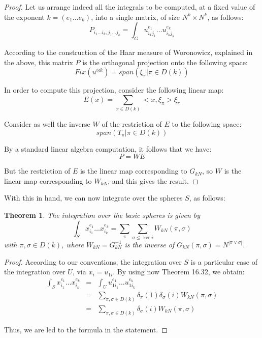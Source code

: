 \documentclass[12pt]{amsbook}
\newtheorem{theorem}{Theorem}[chapter]
\begin{document}
\begin{proof}
Let us arrange indeed all the integrals to be computed, at a fixed value of the exponent $k=(e_1\ldots e_k)$, into a single matrix, of size $N^k\times N^k$, as follows:
$$P_{i_1\ldots i_k,j_1\ldots j_k}=\int_Gu_{i_1j_1}^{e_1}\ldots u_{i_kj_k}^{e_k}$$

According to the construction of the Haar measure of Woronowicz, explained in the above, this matrix $P$ is the orthogonal projection onto the following space:
$$Fix(u^{\otimes k})=span\left(\xi_\pi\Big|\pi\in D(k)\right)$$ 

In order to compute this projection, consider the following linear map:
$$E(x)=\sum_{\pi\in D(k)}<x,\xi_\pi>\xi_\pi$$

Consider as well the inverse $W$ of the restriction of $E$ to the following space:
$$span\left(T_\pi\Big|\pi\in D(k)\right)$$

By a standard linear algebra computation, it follows that we have:
$$P=WE$$

But the restriction of $E$ is the linear map corresponding to $G_{kN}$, so $W$ is the linear map corresponding to $W_{kN}$, and this gives the result.
\end{proof}

With this in hand, we can now integrate over the spheres $S$, as follows:
 
\begin{theorem}
The integration over the basic spheres is given by
$$\int_Sx_{i_1}^{e_1}\ldots x_{i_k}^{e_k}=\sum_\pi\sum_{\sigma\leq\ker i}W_{kN}(\pi,\sigma)$$
with $\pi,\sigma\in D(k)$, where $W_{kN}=G_{kN}^{-1}$ is the inverse of $G_{kN}(\pi,\sigma)=N^{|\pi\vee\sigma|}$. 
\end{theorem}

\begin{proof}
According to our conventions, the integration over $S$ is a particular case of the integration over $U$, via $x_i=u_{1i}$. By using now Theorem 16.32, we obtain:
\begin{eqnarray*}
\int_Sx_{i_1}^{e_1}\ldots x_{i_k}^{e_k}
&=&\int_Uu_{1i_1}^{e_1}\ldots u_{1i_k}^{e_k}\\
&=&\sum_{\pi,\sigma\in D(k)}\delta_\pi(1)\delta_\sigma(i)W_{kN}(\pi,\sigma)\\
&=&\sum_{\pi,\sigma\in D(k)}\delta_\sigma(i)W_{kN}(\pi,\sigma)
\end{eqnarray*}

Thus, we are led to the formula in the statement.
\end{proof}
\end{document}
